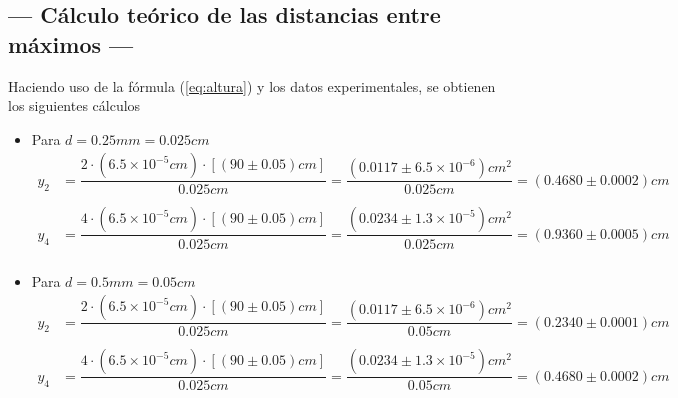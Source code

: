 \documentclass[12pt,a4paper]{article}
\begin{document}
	\subsection{--- Cálculo teórico de las distancias entre máximos ---}	
	Haciendo uso de la fórmula (\ref{eq:altura}) y los datos experimentales, se obtienen los siguientes cálculos
	\begin{itemize}
		\item Para $ d=0.25mm=0.025cm $
		\begin{align*}
			y_2&=\dfrac{2\cdot (6.5\times10^{-5}cm)\cdot[(90\pm 0.05) cm]}{0.025 cm}=
			\dfrac{(0.0117\pm 6.5\times 10^{-6}) cm^2}{0.025 cm}=
			(0.4680\pm 0.0002)cm\\\\
			y_4&=\dfrac{4\cdot (6.5\times10^{-5}cm)\cdot[(90\pm 0.05) cm]}{0.025 cm}=
			\dfrac{(0.0234\pm1.3\times 10^{-5})cm^2}{0.025 cm}=
			(0.9360\pm0.0005)cm\\
		\end{align*}
		\item Para $ d=0.5mm=0.05cm $
		\begin{align*}
			y_2&=\dfrac{2\cdot (6.5\times10^{-5}cm)\cdot[(90\pm 0.05) cm]}{0.025 cm}=
			\dfrac{(0.0117\pm 6.5\times 10^{-6}) cm^2}{0.05 cm}=
			(0.2340\pm 0.0001)cm\\\\
			y_4&=\dfrac{4\cdot (6.5\times10^{-5}cm)\cdot[(90\pm 0.05) cm]}{0.025 cm}=
			\dfrac{(0.0234\pm1.3\times 10^{-5})cm^2}{0.05 cm}=
			(0.4680\pm0.0002)cm\\
		\end{align*}	
	\end{itemize}
\end{document}
